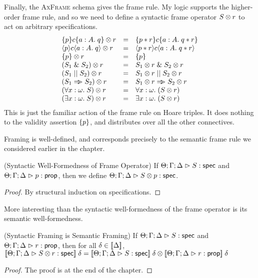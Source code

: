 Finally, the \textsc{AxFrame} schema gives the frame rule. My logic
supports the higher-order frame rule, and so we need to define a
syntactic frame operator ${S} \otimes {r}$ to act on arbitrary
specifications.
\begin{displaymath}
  \begin{array}{lcl}
    {\{{p}\}{c}\{{a:A}.\;{q}\}} \otimes {r}    & = & \{{p * r}\}{c}\{{a:A}.\;{q * r}\} \\
    {\langle{p}\rangle{c}\langle{a:A}.\;{q}\rangle} \otimes {r}   & = & \langle{p * r}\rangle{c}\langle{a:A}.\;{q * r}\rangle \\
    {\{{p}\}} \otimes {r}              & = & \{{p}\} \\
    {(S_1 \;\&\; S_2)} \otimes {r}      & = & {S_1} \otimes {r} \;\&\; {S_2} \otimes {r} \\
    {(S_1 \;||\; S_2)} \otimes {r}       & = & {S_1} \otimes {r} \;||\; {S_2} \otimes {r} \\
    {(S_1 \Rightarrow\!\!\!> S_2)} \otimes {r}      & = & {S_1} \otimes {r} \Rightarrow\!\!\!> {S_2} \otimes {r} \\
    {(\forall x:\omega.\; S)} \otimes {r} & = & \forall x:\omega.\; ({S} \otimes {r}) \\
    {(\exists x:\omega.\; S)} \otimes {r} & = & \exists x:\omega.\; ({S} \otimes {r}) \\
  \end{array}
\end{displaymath}
This is just the familiar action of the frame rule on Hoare triples. It
does nothing to the validity assertion $\{{p}\}$, and distributes over all 
the other connectives. 

Framing is well-defined, and corresponds precisely to the semantic frame rule
we considered earlier in the chapter. 

\begin{prop}{(Syntactic Well-Formedness of Frame Operator)}
If ${\Theta; \Gamma; \Delta} \vartriangleright {S} : \mathsf{spec}$ and ${\Theta; \Gamma; \Delta} \vartriangleright {p} : {\mathsf{prop}}$, then
we define ${\Theta; \Gamma; \Delta} \vartriangleright {{S} \otimes {p}} : \mathsf{spec}$.  
\end{prop}
\begin{proof}
  By structural induction on specifications.
\end{proof}

More interesting than the syntactic well-formedness of the frame
operator is its semantic well-formedness. 

\begin{lemma}{(Syntactic Framing is Semantic Framing)}
If ${\Theta; \Gamma; \Delta} \vartriangleright {S} : \mathsf{spec}$ and ${\Theta; \Gamma; \Delta} \vartriangleright {r} : {\mathsf{prop}}$, then for all $\delta \in [\![{\Delta}]\!]$, 
$[\![{{\Theta; \Gamma; \Delta} \vartriangleright {{S} \otimes {r}} : \mathsf{spec}}]\!]\;\delta = 
{[\![{{\Theta; \Gamma; \Delta} \vartriangleright {S} : \mathsf{spec}}]\!]\;\delta} \otimes {[\![{{\Theta; \Gamma; \Delta} \vartriangleright {r} : {\mathsf{prop}}}]\!]\;\delta}$ \\
\end{lemma}
\begin{proof}
  The proof is at the end of the chapter.
\end{proof}\\

